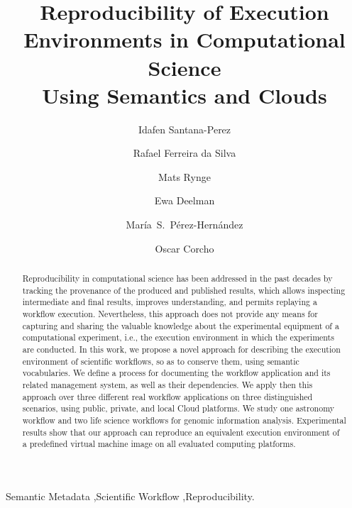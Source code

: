 \documentclass[final,5p,times,twocolumn]{elsarticle}
\begin{document}
\begin{frontmatter}

\title{Reproducibility of Execution Environments in Computational Science\\Using Semantics and Clouds}

\author[upm]{Idafen Santana-Perez}

\author[isi]{Rafael Ferreira da Silva}

\author[isi]{Mats Rynge}

\author[isi]{Ewa Deelman}

\author[upm]{Mar\'ia~S.~P\'erez-Hern\'andez}

\author[upm]{Oscar Corcho}


\address[upm]{Ontology Engineering Group, Universidad Polit\'ecnica de Madrid, Madrid, Spain }
\address[isi]{University of Southern California, Information Sciences Institute, Marina del Rey, CA, USA}


\begin{abstract}
Reproducibility in computational science has been addressed in the past decades 
by tracking the provenance of the produced and published results, which allows 
inspecting intermediate and final results, improves understanding, and permits 
replaying a workflow execution. Nevertheless, this approach does not provide any 
means for capturing and sharing the valuable knowledge about the experimental 
equipment of a computational experiment, i.e., the execution environment in which 
the experiments are conducted. In this work, we propose a novel approach for 
describing the execution environment of scientific workflows, so as to conserve them, 
using semantic vocabularies. We define a process for documenting the workflow 
application and its related management system, as well as their dependencies. 
We apply then this approach over three different real workflow applications on three 
distinguished scenarios, using public, private, and local Cloud platforms. We study 
one astronomy workflow and two life science workflows for genomic information analysis.
Experimental results show that our approach can reproduce an equivalent execution environment of 
a predefined virtual machine image on all evaluated computing platforms.
\end{abstract}

\begin{keyword}
Semantic Metadata \sep Scientific Workflow \sep Reproducibility.
\end{keyword}


\end{frontmatter}
\end{document}
